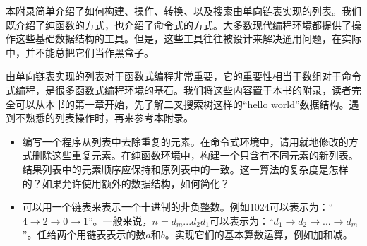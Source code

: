\documentclass[UTF8]{article}
\begin{document}
本附录简单介绍了如何构建、操作、转换、以及搜索由单向链表实现的列表。我们既介绍了纯函数的方式，也介绍了命令式的方式。大多数现代编程环境都提供了操作这些基础数据结构的工具。但是，这些工具往往被设计来解决通用问题，在实际中，并不能总把它们当作黑盒子。

由单向链表实现的列表对于函数式编程非常重要，它的重要性相当于数组对于命令式编程，是很多函数式编程环境的基石。我们将这些内容置于本书的附录，读者完全可以从本书的第一章开始，先了解二叉搜索树这样的“hello world”数据结构。遇到不熟悉的列表操作时，再来参考本附录。

\begin{Exercise}
\begin{itemize}
\item 编写一个程序从列表中去除重复的元素。在命令式环境中，请用就地修改的方式删除这些重复元素。在纯函数环境中，构建一个只含有不同元素的新列表。结果列表中的元素顺序应保持和原列表中的一致。这一算法的复杂度是怎样的？如果允许使用额外的数据结构，如何简化？
\item 可以用一个链表来表示一个十进制的非负整数。例如1024可以表示为：“$4 \rightarrow 2 \rightarrow 0 \rightarrow 1$”。一般来说，$n = d_m...d_2d_1$可以表示为：“$d_1 \rightarrow d_2 \rightarrow ... \rightarrow d_m$”。任给两个用链表表示的数$a$和$b$。实现它们的基本算数运算，例如加和减。
\end{itemize}
\end{Exercise}

\end{document}
